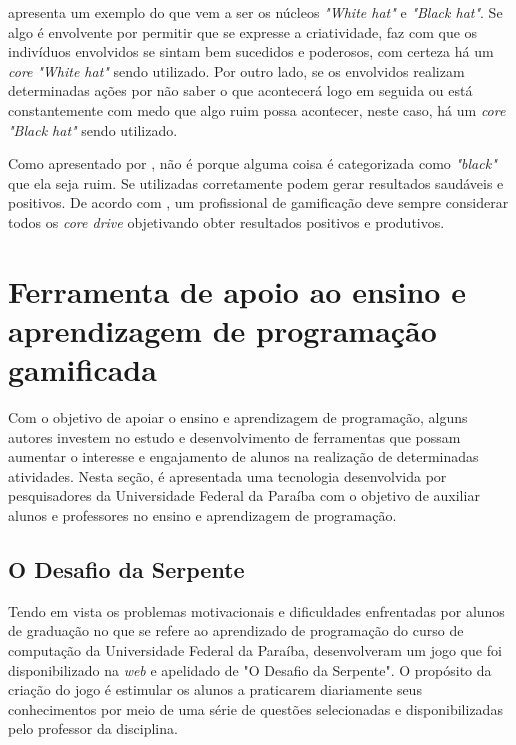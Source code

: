  apresenta um exemplo do que vem a ser os núcleos \textit{"White hat"} e \textit{"Black hat"}. Se algo é envolvente
por permitir que se expresse a criatividade, faz com que os indivíduos envolvidos se sintam bem sucedidos e poderosos, com certeza há um \textit{core} 
\textit{"White hat"} sendo utilizado. Por outro lado, se os envolvidos realizam determinadas ações por não saber o que acontecerá logo em seguida ou está
constantemente com medo que algo ruim possa acontecer, neste caso, há um \textit{core} \textit{"Black hat"} sendo utilizado.

Como apresentado por , não é porque alguma coisa é categorizada como \textit{"black"} que ela seja ruim. Se utilizadas
corretamente podem gerar resultados saudáveis e positivos. De acordo com , um profissional de gamificação deve sempre considerar
todos os \textit{core drive} objetivando obter resultados positivos e produtivos.


\section{Ferramenta de apoio ao ensino e aprendizagem de programação gamificada}

Com o objetivo de apoiar o ensino e aprendizagem de programação, alguns autores investem no estudo e desenvolvimento
de ferramentas que possam aumentar o interesse e engajamento de alunos na realização de determinadas atividades. Nesta
seção, é apresentada uma tecnologia desenvolvida por pesquisadores da Universidade Federal da Paraíba com o objetivo de auxiliar
alunos e professores no ensino e aprendizagem de programação.

\subsection{O Desafio da Serpente}
Tendo em vista os problemas motivacionais e dificuldades enfrentadas por alunos de graduação no que se refere ao
aprendizado de programação do curso de computação da Universidade Federal
da Paraíba,  desenvolveram um jogo que foi disponibilizado na \textit{web} {\itshape} e apelidado
de "O Desafio da Serpente". O propósito da criação do jogo é estimular os alunos a praticarem diariamente seus conhecimentos
por meio de uma série de questões selecionadas e disponibilizadas pelo professor da disciplina.

